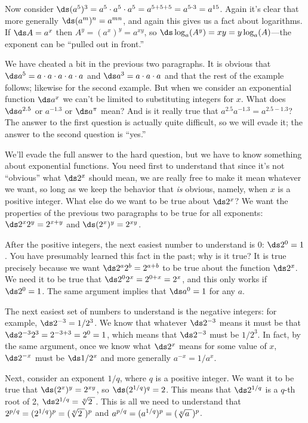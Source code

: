 Now consider $\ds (a^5)^3=a^5\cdot a^5\cdot a^5=a^{5+5+5}=a^{5\cdot 3}=a^{15}$.
Again it's clear that more generally $\ds (a^m)^n=a^{mn}$, and again this
gives us a fact about logarithms. If $\ds A=a^x$ then
$A^y=(a^x)^y=a^{xy}$, so $\ds \log_a(A^y)=xy=y\log_a(A)$---the exponent
can be ``pulled out in front.''

We have cheated a bit in the previous two paragraphs. It is obvious
that $\ds a^5=a\cdot a\cdot a\cdot a\cdot a$ and $\ds a^3=a\cdot a\cdot a$ and
that the rest of the example follows; likewise for the second
example. But when we consider an exponential function $\ds a^x$ we can't
be limited to substituting integers for $x$. What does $\ds a^{2.5}$ or
$a^{-1.3}$ or $\ds a^\pi$ mean? And is it really true that
$a^{2.5}a^{-1.3}=a^{2.5-1.3}$? The answer to the first question is
actually quite difficult, so we will evade it; the answer to the
second question is ``yes.''

We'll evade the full answer to the hard question, but we have to know
something about exponential functions. You need first to understand
that since it's not ``obvious'' what $\ds 2^x$ should mean, we are really
free to make it mean whatever we want, so long as we keep the behavior
that {\it is\/} obvious, namely, when $x$ is a positive integer.
What else do we want to be true about $\ds 2^x$? We
want the properties of the previous two paragraphs to be true for all
exponents: $\ds 2^x2^y=2^{x+y}$ and $\ds (2^x)^y=2^{xy}$.

After the positive integers, the next easiest
number to understand is 0: $\ds 2^0=1$. You have presumably learned this
fact in the past; why is it true?  It
is true precisely because we want $\ds 2^a2^b=2^{a+b}$ to be true about
the function $\ds 2^x$. We need it to be true that $\ds 2^02^x=2^{0+x}=2^x$,
and this only works if $\ds 2^0=1$. The same argument implies that $\ds a^0=1$
for any $a$.

The next
easiest set of numbers to
understand is the negative integers: for example, $\ds 2^{-3}=1/2^3$. 
We know that whatever $\ds 2^{-3}$ means it must be
that $\ds 2^{-3}2^{3}=2^{-3+3}=2^0=1$, which means that $\ds 2^{-3}$ must be
$1/2^3$. In fact, by the same argument, once we know what $\ds 2^x$ means
for some value of $x$, $\ds 2^{-x}$ must be $\ds 1/2^{x}$ and more generally
$a^{-x}=1/a^x$.

Next, consider an exponent $1/q$, where $q$ is a positive integer. We
want it to be true that $\ds (2^x)^y=2^{xy}$, so $\ds
(2^{1/q})^q=2$. This means that $\ds 2^{1/q}$ is a $q$-th root of 2,
$\ds 2^{1/q}=\root q\of{2\ }$. This is all we need to understand that
$2^{p/q}=(2^{1/q})^p=(\root q\of{2\ })^p$ and
$a^{p/q}=(a^{1/q})^p=(\root q\of{a\ })^p$.

